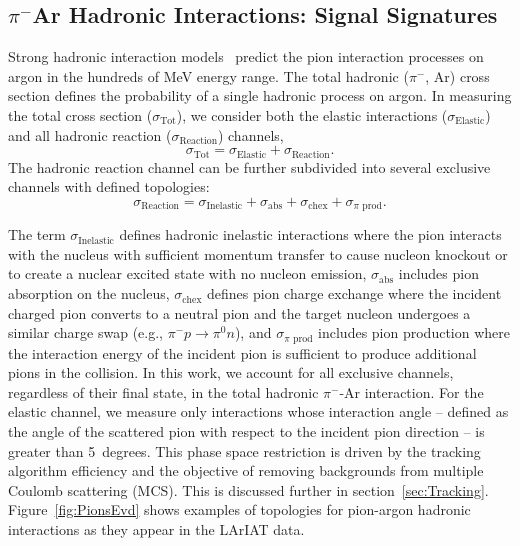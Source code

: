 \documentclass[%
 floatfix,
 reprint,
 twocolumn,
superscriptaddress,
showpacs,preprintnumbers,
 amsmath,amssymb,
 aps,
prd,
]{revtex4-1}
\begin{document}
\subsection{\label{sec:Sign} $\pi^{-}$Ar Hadronic Interactions: Signal Signatures}
Strong hadronic interaction models~\cite{9780198520085,9780471779957} predict the pion interaction processes on argon in the hundreds of MeV energy range. The total hadronic ($\pi^-$, Ar)  cross section defines the probability of a single hadronic process on argon.  In measuring the total cross section ($\sigma_\text{Tot}$), we consider both the elastic interactions ($\sigma_\text{Elastic}$) and all hadronic reaction ($\sigma_\text{Reaction}$) channels, 
\begin{equation}
\sigma_\text{Tot} = \sigma_\text{Elastic}+ \sigma_\text{Reaction}.
\end{equation}
The hadronic reaction channel can be further subdivided into several exclusive channels with defined topologies:
\begin{equation}
\sigma_\text{Reaction} = \sigma_\text{Inelastic} + \sigma_\text{abs} + \sigma_\text{chex}+ \sigma_\text{$\pi$ prod}.
\end{equation}

The term $\sigma_\text{Inelastic}$ defines hadronic inelastic interactions where the pion interacts with the nucleus with sufficient momentum transfer to cause nucleon knockout or to create a nuclear excited state with no nucleon emission, $\sigma_\text{abs}$ includes pion absorption on the nucleus, $\sigma_\text{chex}$ defines pion charge exchange where the incident charged pion converts to a neutral pion and the target nucleon undergoes a similar charge swap (e.g., $\pi^{-} p \rightarrow \pi^{0}n$), and $\sigma_\text{$\pi$ prod}$ includes pion production where the interaction energy of the incident pion is sufficient to produce additional pions in the collision. In this work, we account for all exclusive channels, regardless of their final state, in the total hadronic $\pi^{-}$-Ar interaction. For the elastic channel, we measure only interactions whose interaction angle -- defined as the angle of the scattered pion with respect to the incident pion direction -- is greater than 5~degrees. This phase space restriction is driven by the tracking algorithm efficiency and the objective of removing backgrounds from multiple Coulomb scattering (MCS). This is discussed further in section~\ref{sec:Tracking}.
Figure~\ref{fig:PionsEvd} shows examples of topologies for pion-argon hadronic interactions as they appear in the  LArIAT data. 
\end{document}
